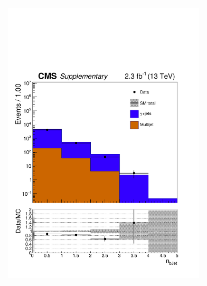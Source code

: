 \begin{figure}[tbhp]
\begin{center}
     \includegraphics[width=0.45\textwidth]{SinglePhoton_nBJet40_all_all_aux} \\
  \end{center}
\end{figure}


